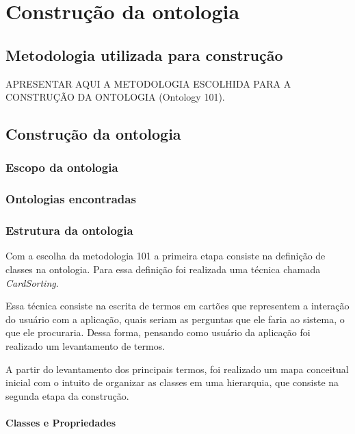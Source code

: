 \chapter{Construção da ontologia}

  \section{Metodologia utilizada para construção}
    
    APRESENTAR AQUI A METODOLOGIA ESCOLHIDA PARA A CONSTRUÇÃO DA ONTOLOGIA (Ontology 101).
    
  \section{Construção da ontologia}
    
    \subsection{Escopo da ontologia}
    
    \subsection{Ontologias encontradas}
   
      
      
    \pagebreak
    \subsection{Estrutura da ontologia}

	  Com a escolha da metodologia 101 a primeira etapa consiste na definição de classes na ontologia.
	  Para essa definição foi realizada uma técnica chamada \textit{CardSorting}. 
	  
	  Essa técnica consiste na escrita de termos em cartões que representem a interação do usuário com a aplicação,
	  quais seriam as perguntas que ele faria ao sistema, o que ele procuraria. Dessa forma, pensando como usuário
	  da aplicação foi realizado um levantamento de termos.

	  A partir do levantamento dos principais termos, foi realizado um mapa conceitual inicial com o intuito
	  de organizar as classes em uma hierarquia, que consiste na segunda etapa da construção.

      \subsubsection{Classes e Propriedades}
      
